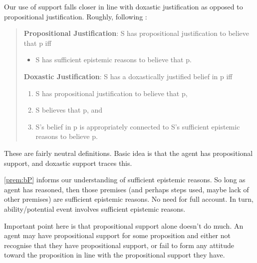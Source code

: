 \begin{note}
    Our use of support falls closer in line with doxastic justification as opposed to propositional justification.
  Roughly, following \textcite{Silva:2020aa}:

  \begin{quote}
    \textbf{Propositional Justification}: S has propositional justification to believe that p iff
    \begin{itemize}
    \item S has sufficient epistemic reasons to believe that p.
    \end{itemize}

    \textbf{Doxastic Justification}: S has a doxastically justified belief in p iff
    \begin{enumerate}[label=(\roman*), ref=(\roman*)]
    \item\label{dj:def:i} S has propositional justification to believe that p,
    \item\label{dj:def:ii} S believes that p, and
    \item\label{dj:def:iii} S's belief in p is appropriately connected to S's sufficient epistemic reasons to believe p.
    \end{enumerate}
  \end{quote}

  These are fairly neutral definitions.
  Basic idea is that the agent has propositional support, and doxastic support traces this.

  \ref{prem:bP} informs our understanding of sufficient epistemic reasons.
  So long as agent has reasoned, then those premises (and perhaps steps used, maybe lack of other premises) are sufficient epistemic reasons.
  No need for full account.
  In turn, ability/potential event involves sufficient epistemic reasons.

  Important point here is that propositional support alone doesn't do much.
  An agent may have propositional support for some proposition and either not recognise that they have propositional support, or fail to form any attitude toward the proposition in line with the propositional support they have.
\end{note}

